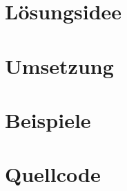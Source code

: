 \documentclass[a4paper,10pt,ngerman]{scrartcl}
\title{\Aufgabe}
\author{\Name / \Einsendenummer}
\date{27. November 2017}
\begin{document}
\maketitle
\tableofcontents

\section{Lösungsidee}


\section{Umsetzung}


\section{Beispiele}


\newpage
\section{Quellcode}


\nocite{*} %
\printbibliography[heading=bibintoc]%
\end{document}

